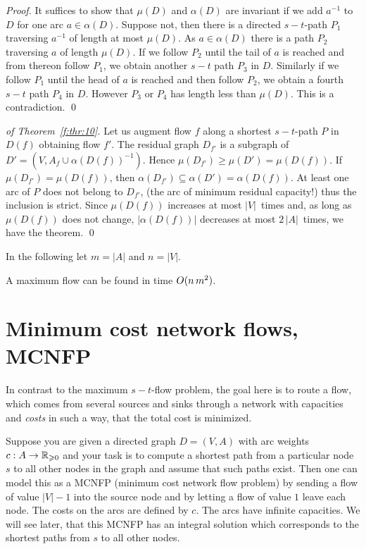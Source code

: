 \begin{proof}
  It suffices to show that $\mu(D)$ and $\alpha(D)$ are invariant if we add
  $a^{-1}$ to $D$ for one arc $a \in \alpha(D)$. Suppose not, then there is a
  directed $s-t$-path $P_1$ traversing $a^{-1}$ of length at most
  $\mu(D)$. As $a \in \alpha(D)$ there is a path $P_2$ traversing $a$ of length
  $\mu(D)$. If we follow $P_2$  until the tail of $a$ is reached  and
  from thereon follow $P_1$, we obtain another $s-t$ path $P_3$ in $D$.
  Similarly if we follow $P_1$ until the head of $a$ is reached and then follow $P_2$,
  we obtain a fourth $s-t$ path $P_4$ in $D$. However $P_3$ or $P_4$ has length less
  than $\mu(D)$. This is a contradiction. \qed
\end{proof}


\begin{proof}[of Theorem~\ref{f:thr:10}]
  Let us augment flow $f$ along a shortest $s-t$-path $P$ in $D(f)$
  obtaining flow $f'$. The residual graph $D_{f'}$ is a subgraph of
  $D' = (V, A_f \cup\alpha(D(f))^{-1})$. Hence $\mu(D_{f'}) \geq \mu(D')=\mu(D(f))$. If
  $\mu(D_{f'})=\mu(D(f))$, then $\alpha(D_{f'})\subseteq\alpha(D') = \alpha(D(f))$. At least one
  arc of $P$ does not belong to $D_{f'}$, (the arc of minimum residual
  capacity!) thus the inclusion is
  strict. Since $\mu(D(f))$ increases at most $|V|$~times and, as long as
  $\mu(D(f))$ does not change, $|\alpha(D(f))|$ decreases at most $2\, |A|$~times, we
  have the theorem. \qed
\end{proof}

In the following let $m = |A|$ and $n = |V|$. 

\begin{corollary}
  \label{co:2}
  A maximum flow can be found in time $O(n \, m^2)$.
\end{corollary}




\section{Minimum cost network flows, MCNFP}
\label{sec:minimum-cots-flows}

In contrast to the maximum $s-t$-flow problem, the goal here is to
route a flow, which comes from several sources and sinks through a
network with capacities and \emph{costs} in such a way, that the total
cost is minimized. 

\begin{example}
  Suppose you are given a directed graph $D=(V,A)$ with arc weights  
  $c: A \to \mathbb{R}_{\geqslant0}$ and your task is to compute a shortest 
  path from a particular node $s$ to all other nodes in the graph 
  and assume that such paths exist. Then one can model this as a 
  MCNFP (minimum cost network flow problem) by sending a flow of 
  value $|V|-1$ into the source node 
  and by letting a flow of value $1$ leave each node. The costs on 
  the arcs are defined by $c$. The arcs have infinite capacities. 
  We will see later, that this MCNFP 
  has an integral solution which corresponds to the shortest
  paths from $s$ to all other nodes. 
\end{example}


